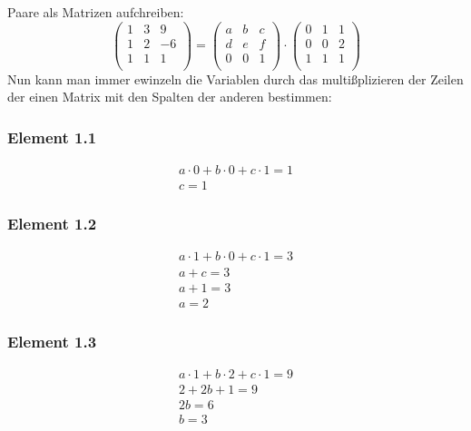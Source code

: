 \documentclass{article}
\begin{document}
Paare als Matrizen aufchreiben:
$$
\begin{pmatrix}
    1 & 3 & 9 \\
    1 & 2 & -6 \\
    1 & 1 & 1 \\
\end{pmatrix}
=
\begin{pmatrix}
    a & b & c \\
    d & e & f \\
    0 & 0 & 1 \\
\end{pmatrix}
\cdot
\begin{pmatrix}
    0 & 1 & 1 \\
    0 & 0 & 2 \\
    1 & 1 & 1 \\
\end{pmatrix}
$$
Nun kann man immer ewinzeln die Variablen durch das multißplizieren der Zeilen der einen Matrix mit den Spalten der anderen bestimmen:
\subsubsection*{Element 1.1}

\begin{align*}
    a \cdot 0 + b \cdot 0 + c \cdot 1 = 1 \\
    c = 1
\end{align*}

\subsubsection*{Element 1.2}

\begin{align*}
    a \cdot 1 + b \cdot 0 + c \cdot 1 = 3 \\
    a + c = 3 \\
    a + 1 = 3 \\
    a = 2
\end{align*}

\subsubsection*{Element 1.3}

\begin{align*}
    a \cdot 1 + b \cdot 2 + c \cdot 1 = 9 \\
    2 + 2b + 1 = 9 \\
    2b = 6 \\
    b = 3
\end{align*}
\end{document}
